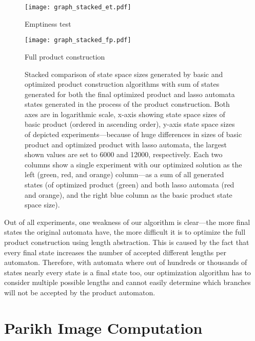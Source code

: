 \begin{figure*}[ht]
    \centering
    \begin{minipage}{0.49\linewidth}
        \centering
        \texttt{[image: graph\_stacked\_et.pdf]}
        \caption{Emptiness test}
        \label{fig:graph:stacked_et_state_space_sizes_comp_with_lasso}
    \end{minipage}
    \hfill
    \begin{minipage}{0.49\linewidth}
        \centering
        \texttt{[image: graph\_stacked\_fp.pdf]}
        \caption{Full product construction}
        \label{fig:graph:stacked_fp_state_space_sizes_comp_with_lasso}
    \end{minipage}
    \vspace{0.5cm}
    \caption{Stacked comparison of state space sizes generated by basic and optimized product construction algorithms with sum of states generated for both the final optimized product and lasso automata states generated in the process of the product construction. Both axes are in logarithmic scale, x-axis showing state space sizes of basic product (ordered in ascending order), y-axis state space sizes of depicted experiments---because of huge differences in sizes of basic product and optimized product with lasso automata, the largest shown values are set to 6000 and 12000, respectively. Each two columns show a single experiment with our optimized solution as the left (green, red, and orange) column---as a sum of all generated states (of optimized product (green) and both lasso automata (red and orange), and the right blue column as the basic product state space size).}
    \label{fig:graph:stacked_product_state_space_sizes_with_lasso}
\end{figure*}

Out of all experiments, one weakness of our algorithm is clear---the more final states the original automata have, the more difficult it is to optimize the full product construction using length abstraction. This is caused by the fact that every final state increases the number of accepted different lengths per automaton. Therefore, with automata where out of hundreds or thousands of states nearly every state is a final state too, our optimization algorithm has to consider multiple possible lengths and cannot easily determine which branches will not be accepted by the product automaton.

\section{Parikh Image Computation}

